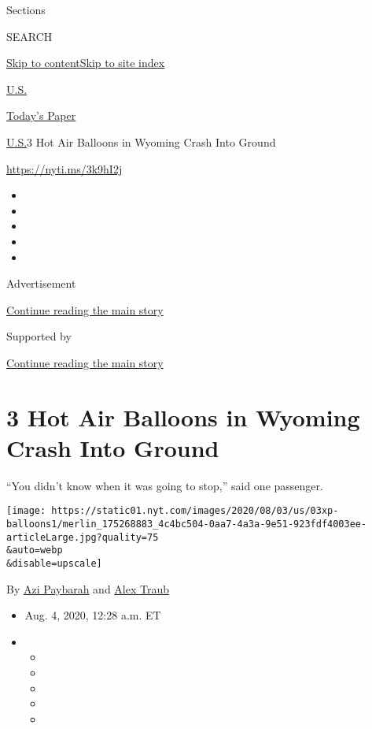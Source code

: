 Sections

SEARCH

\protect\hyperlink{site-content}{Skip to
content}\protect\hyperlink{site-index}{Skip to site index}

\href{https://www.nytimes.com/section/us}{U.S.}

\href{https://myaccount.nytimes.com/auth/login?response_type=cookie\&client_id=vi}{}

\href{https://www.nytimes.com/section/todayspaper}{Today's Paper}

\href{/section/us}{U.S.}\textbar{}3 Hot Air Balloons in Wyoming Crash
Into Ground

\url{https://nyti.ms/3k9hI2j}

\begin{itemize}
\item
\item
\item
\item
\item
\end{itemize}

Advertisement

\protect\hyperlink{after-top}{Continue reading the main story}

Supported by

\protect\hyperlink{after-sponsor}{Continue reading the main story}

\hypertarget{3-hot-air-balloons-in-wyoming-crash-into-ground}{%
\section{3 Hot Air Balloons in Wyoming Crash Into
Ground}\label{3-hot-air-balloons-in-wyoming-crash-into-ground}}

``You didn't know when it was going to stop,'' said one passenger.

\texttt{[image: https://static01.nyt.com/images/2020/08/03/us/03xp-balloons1/merlin\_175268883\_4c4bc504-0aa7-4a3a-9e51-923fdf4003ee-articleLarge.jpg?quality=75\\\&auto=webp\\\&disable=upscale]}

By \href{https://www.nytimes.com/by/azi-paybarah}{Azi Paybarah} and
\href{https://www.nytimes.com/by/alex-traub}{Alex Traub}

\begin{itemize}
\item
  Aug. 4, 2020, 12:28 a.m. ET
\item
  \begin{itemize}
  \item
  \item
  \item
  \item
  \item
  \end{itemize}
\end{itemize}

